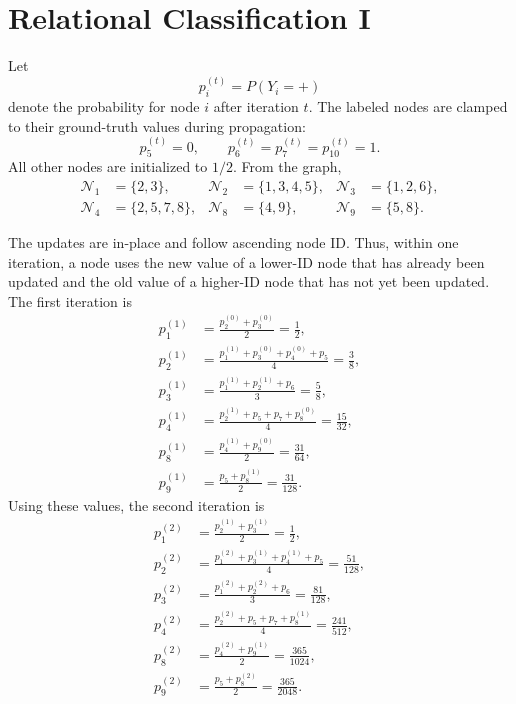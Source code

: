 \clearpage
\section{Relational Classification I}

Let
\[
  p_i^{(t)}=P(Y_i=+)
\]
denote the probability for node $i$ after iteration $t$. The labeled nodes
are clamped to their ground-truth values during propagation:
\[
  p_5^{(t)}=0,\qquad
  p_6^{(t)}=p_7^{(t)}=p_{10}^{(t)}=1.
\]
All other nodes are initialized to $1/2$. From the graph,
\begin{align*}
  \mathcal{N}_1&=\{2,3\},&
  \mathcal{N}_2&=\{1,3,4,5\},&
  \mathcal{N}_3&=\{1,2,6\},\\
  \mathcal{N}_4&=\{2,5,7,8\},&
  \mathcal{N}_8&=\{4,9\},&
  \mathcal{N}_9&=\{5,8\}.
\end{align*}

The updates are in-place and follow ascending node ID. Thus, within one
iteration, a node uses the new value of a lower-ID node that has already been
updated and the old value of a higher-ID node that has not yet been updated.
The first iteration is
\begin{align*}
  p_1^{(1)}
    &=\frac{p_2^{(0)}+p_3^{(0)}}{2}
      =\frac{1}{2},\\
  p_2^{(1)}
    &=\frac{p_1^{(1)}+p_3^{(0)}+p_4^{(0)}+p_5}{4}
      =\frac{3}{8},\\
  p_3^{(1)}
    &=\frac{p_1^{(1)}+p_2^{(1)}+p_6}{3}
      =\frac{5}{8},\\
  p_4^{(1)}
    &=\frac{p_2^{(1)}+p_5+p_7+p_8^{(0)}}{4}
      =\frac{15}{32},\\
  p_8^{(1)}
    &=\frac{p_4^{(1)}+p_9^{(0)}}{2}
      =\frac{31}{64},\\
  p_9^{(1)}
    &=\frac{p_5+p_8^{(1)}}{2}
      =\frac{31}{128}.
\end{align*}
Using these values, the second iteration is
\begin{align*}
  p_1^{(2)}
    &=\frac{p_2^{(1)}+p_3^{(1)}}{2}
      =\frac{1}{2},\\
  p_2^{(2)}
    &=\frac{p_1^{(2)}+p_3^{(1)}+p_4^{(1)}+p_5}{4}
      =\frac{51}{128},\\
  p_3^{(2)}
    &=\frac{p_1^{(2)}+p_2^{(2)}+p_6}{3}
      =\frac{81}{128},\\
  p_4^{(2)}
    &=\frac{p_2^{(2)}+p_5+p_7+p_8^{(1)}}{4}
      =\frac{241}{512},\\
  p_8^{(2)}
    &=\frac{p_4^{(2)}+p_9^{(1)}}{2}
      =\frac{365}{1024},\\
  p_9^{(2)}
    &=\frac{p_5+p_8^{(2)}}{2}
      =\frac{365}{2048}.
\end{align*}

